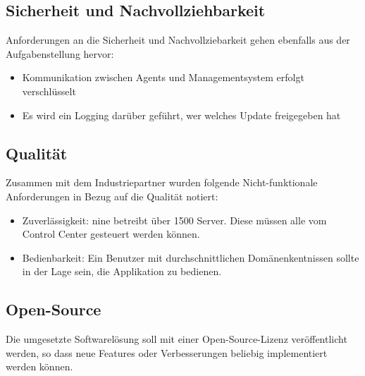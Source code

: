 \subsection*{Sicherheit und Nachvollziehbarkeit}
Anforderungen an die Sicherheit und Nachvollziebarkeit gehen ebenfalls aus der Aufgabenstellung hervor:

\begin{itemize}
\item Kommunikation zwischen Agents und Managementsystem erfolgt verschlüsselt
\item Es wird ein Logging darüber geführt, wer welches Update freigegeben hat
\end{itemize}

\subsection*{Qualität}

Zusammen mit dem Industriepartner wurden folgende Nicht-funktionale Anforderungen in Bezug auf die Qualität notiert:

\begin{itemize}
\item Zuverlässigkeit: \gls{nine} betreibt über 1500 Server. Diese müssen alle vom Control Center gesteuert werden können.
\item Bedienbarkeit: Ein Benutzer mit durchschnittlichen Domänenkentnissen sollte in der Lage sein, die Applikation zu bedienen.
\end{itemize}

\subsection*{Open-Source}

Die umgesetzte Softwarelösung soll mit einer Open-Source-Lizenz veröffentlicht werden, so dass neue Features oder Verbesserungen beliebig implementiert werden können.